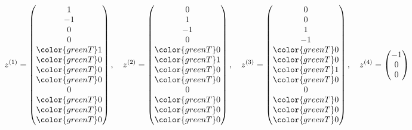\begin{loesung}
\[
z^{(1)}=
\begin{pmatrix}
              1\\
             -1\\
              0\\
              0\\
\color{greenT} 1\\
\color{greenT} 0\\
\color{greenT} 0\\
\color{greenT} 0\\
              0\\
\color{greenT} 0\\
\color{greenT} 0\\
\color{greenT} 0
\end{pmatrix}
,\quad
z^{(2)}=\begin{pmatrix}
              0\\
              1\\
             -1\\
              0\\
\color{greenT} 0\\
\color{greenT} 1\\
\color{greenT} 0\\
\color{greenT} 0\\
              0\\
\color{greenT} 0\\
\color{greenT} 0\\
\color{greenT} 0
\end{pmatrix}
,\quad
z^{(3)}=\begin{pmatrix}
              0\\
              0\\
              1\\
             -1\\
\color{greenT} 0\\
\color{greenT} 0\\
\color{greenT} 1\\
\color{greenT} 0\\
              0\\
\color{greenT} 0\\
\color{greenT} 0\\
\color{greenT} 0
\end{pmatrix}
,\quad
z^{(4)}=\begin{pmatrix}
             -1\\
              0\\
              0\\

\end{pmatrix}\]
\end{loesung}
